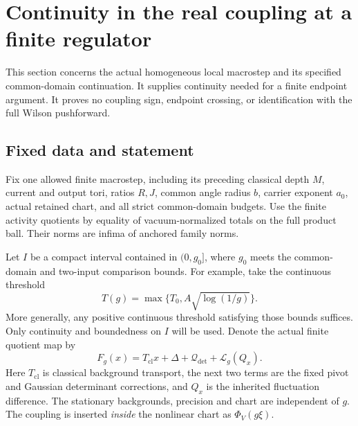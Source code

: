 \section{Continuity in the real coupling at a finite regulator}
\label{fqc-section}

This section concerns the actual homogeneous local macrostep and its
specified common-domain continuation. It supplies continuity needed
for a finite endpoint argument. It proves no coupling sign, endpoint
crossing, or identification with the full Wilson pushforward.

\subsection{Fixed data and statement}
\label{fqc-setup}

Fix one allowed finite macrostep, including its preceding classical
depth $M$, current and output tori, ratios $R,J$, common angle radius
$b$, carrier exponent $a_0$, actual retained chart, and all strict
common-domain budgets. Use the finite activity quotients by equality
of vacuum-normalized totals on the full product ball. Their norms
are infima of anchored family norms.

Let $I$ be a compact interval contained in $(0,g_0]$, where $g_0$
meets the common-domain and two-input comparison bounds. For example,
take the continuous threshold
\begin{equation}
 T(g)=\max\{T_0,A\sqrt{\log(1/g)}\}.
 \label{fqc-threshold}
\end{equation}
More generally, any positive continuous threshold satisfying those
bounds suffices. Only continuity and boundedness on $I$ will be used.
Denote the actual finite quotient map by
\begin{equation}
 F_g(x)=T_{\mathrm{cl}}x+\Delta+\mathcal Q_{\det}
                         +\mathcal L_g(Q_x).
 \label{fqc-map}
\end{equation}
Here $T_{\mathrm{cl}}$ is classical background transport, the next two
terms are the fixed pivot and Gaussian determinant corrections, and
$Q_x$ is the inherited fluctuation difference. The stationary
backgrounds, precision and chart are independent of $g$. The
coupling is inserted \emph{inside} the nonlinear chart as
$\Phi_V(g\xi)$.

